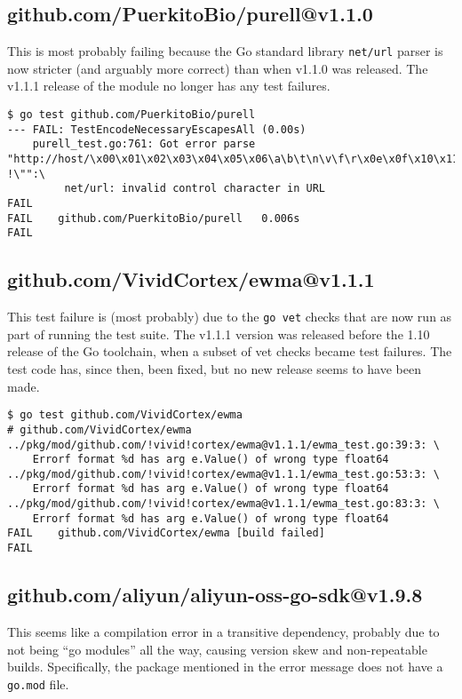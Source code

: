 \documentclass[a4paper]{paper}
\begin{document}
\subsection{github.com/PuerkitoBio/purell@v1.1.0}

This is most probably failing because the Go standard library {\tt net/url}
parser is now stricter (and arguably more correct) than when v1.1.0
was released. The v1.1.1 release of the module no longer has any test
failures.

\begin{verbatim}
$ go test github.com/PuerkitoBio/purell       
--- FAIL: TestEncodeNecessaryEscapesAll (0.00s)
    purell_test.go:761: Got error parse "http://host/\x00\x01\x02\x03\x04\x05\x06\a\b\t\n\v\f\r\x0e\x0f\x10\x11\x12\x13\x14\x15\x16\x17\x18\x19\x1a\x1b\x1c\x1d\x1e\x1f !\"":\
         net/url: invalid control character in URL
FAIL
FAIL	github.com/PuerkitoBio/purell	0.006s
FAIL
\end{verbatim}

\subsection{github.com/VividCortex/ewma@v1.1.1}

This test failure is (most probably) due to the {\tt go vet} checks
that are now run as part of running the test suite. The v1.1.1 version
was released before the 1.10 release of the Go toolchain, when a
subset of vet checks became test failures. The test code has, since
then, been fixed, but no new release seems to have been made.

\begin{verbatim}
$ go test github.com/VividCortex/ewma
# github.com/VividCortex/ewma
../pkg/mod/github.com/!vivid!cortex/ewma@v1.1.1/ewma_test.go:39:3: \
    Errorf format %d has arg e.Value() of wrong type float64
../pkg/mod/github.com/!vivid!cortex/ewma@v1.1.1/ewma_test.go:53:3: \
    Errorf format %d has arg e.Value() of wrong type float64
../pkg/mod/github.com/!vivid!cortex/ewma@v1.1.1/ewma_test.go:83:3: \
    Errorf format %d has arg e.Value() of wrong type float64
FAIL	github.com/VividCortex/ewma [build failed]
FAIL
\end{verbatim}

\subsection{github.com/aliyun/aliyun-oss-go-sdk@v1.9.8}

This seems like a compilation error in a transitive dependency,
probably due to not being ``go modules'' all the way,
causing version skew and non-repeatable builds. Specifically, the
package mentioned in the error message does not have a {\tt go.mod}
file.
\end{document}
